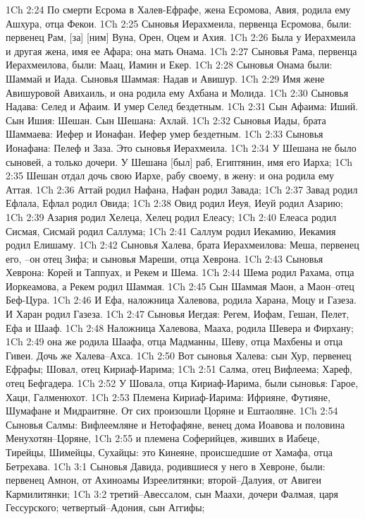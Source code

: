 1Ch 2:24  По смерти Есрома в Халев-Ефрафе, жена Есромова, Авия, родила ему Ашхура, отца Фекои.
1Ch 2:25  Сыновья Иерахмеила, первенца Есромова, были: первенец Рам, [за] [ним] Вуна, Орен, Оцем и Ахия.
1Ch 2:26  Была у Иерахмеила и другая жена, имя ее Афара; она мать Онама.
1Ch 2:27  Сыновья Рама, первенца Иерахмеилова, были: Маац, Иамин и Екер.
1Ch 2:28  Сыновья Онама были: Шаммай и Иада. Сыновья Шаммая: Надав и Авишур.
1Ch 2:29  Имя жене Авишуровой Авихаиль, и она родила ему Ахбана и Молида.
1Ch 2:30  Сыновья Надава: Селед и Афаим. И умер Селед бездетным.
1Ch 2:31  Сын Афаима: Иший. Сын Ишия: Шешан. Сын Шешана: Ахлай.
1Ch 2:32  Сыновья Иады, брата Шаммаева: Иефер и Ионафан. Иефер умер бездетным.
1Ch 2:33  Сыновья Ионафана: Пелеф и Заза. Это сыновья Иерахмеила.
1Ch 2:34  У Шешана не было сыновей, а только дочери. У Шешана [был] раб, Египтянин, имя его Иарха;
1Ch 2:35  Шешан отдал дочь свою Иархе, рабу своему, в жену: и она родила ему Аттая.
1Ch 2:36  Аттай родил Нафана, Нафан родил Завада;
1Ch 2:37  Завад родил Ефлала, Ефлал родил Овида;
1Ch 2:38  Овид родил Иеуя, Иеуй родил Азарию;
1Ch 2:39  Азария родил Хелеца, Хелец родил Елеасу;
1Ch 2:40  Елеаса родил Сисмая, Сисмай родил Саллума;
1Ch 2:41  Саллум родил Иекамию, Иекамия родил Елишаму.
1Ch 2:42  Сыновья Халева, брата Иерахмеилова: Меша, первенец его, --он отец Зифа; и сыновья Мареши, отца Хеврона.
1Ch 2:43  Сыновья Хеврона: Корей и Таппуах, и Рекем и Шема.
1Ch 2:44  Шема родил Рахама, отца Иоркеамова, а Рекем родил Шаммая.
1Ch 2:45  Сын Шаммая Маон, а Маон--отец Беф-Цура.
1Ch 2:46  И Ефа, наложница Халевова, родила Харана, Моцу и Газеза. И Харан родил Газеза.
1Ch 2:47  Сыновья Иегдая: Регем, Иофам, Гешан, Пелет, Ефа и Шааф.
1Ch 2:48  Наложница Халевова, Мааха, родила Шевера и Фирхану;
1Ch 2:49  она же родила Шаафа, отца Мадманны, Шеву, отца Махбены и отца Гивеи. Дочь же Халева--Ахса.
1Ch 2:50  Вот сыновья Халева: сын Хур, первенец Ефрафы; Шовал, отец Кириаф-Иарима;
1Ch 2:51  Салма, отец Вифлеема; Хареф, отец Бефгадера.
1Ch 2:52  У Шовала, отца Кириаф-Иарима, были сыновья: Гарое, Хаци, Галменюхот.
1Ch 2:53  Племена Кириаф-Иарима: Ифрияне, Футияне, Шумафане и Мидраитяне. От сих произошли Цоряне и Ештаоляне.
1Ch 2:54  Сыновья Салмы: Вифлеемляне и Нетофафяне, венец дома Иоавова и половина Менухотян--Цоряне,
1Ch 2:55  и племена Соферийцев, живших в Иабеце, Тирейцы, Шимейцы, Сухайцы: это Кинеяне, происшедшие от Хамафа, отца Бетрехава.
1Ch 3:1  Сыновья Давида, родившиеся у него в Хевроне, были: первенец Амнон, от Ахиноамы Изреелитянки; второй--Далуия, от Авигеи Кармилитянки;
1Ch 3:2  третий--Авессалом, сын Маахи, дочери Фалмая, царя Гессурского; четвертый--Адония, сын Аггифы;
